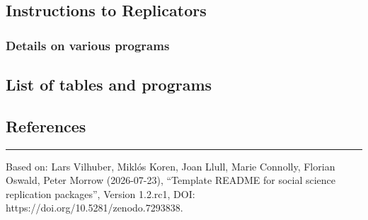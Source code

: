 \documentclass[
]{article}
\begin{document}
\hypertarget{instructions-to-replicators}{%
\subsection{Instructions to
Replicators}\label{instructions-to-replicators}}

\hypertarget{details-on-various-programs}{%
\subsubsection{Details on various
programs}\label{details-on-various-programs}}

\hypertarget{list-of-tables-and-programs}{%
\subsection{List of tables and
programs}\label{list-of-tables-and-programs}}

\hypertarget{references}{%
\subsection{References}\label{references}}

\begin{center}\rule{0.5\linewidth}{0.5pt}\end{center}

Based on: Lars Vilhuber, Miklós Koren, Joan Llull, Marie Connolly,
Florian Oswald, Peter Morrow (2026-07-23), ``Template README for social
science replication packages'', Version 1.2.rc1, DOI:
https://doi.org/10.5281/zenodo.7293838.
\end{document}
